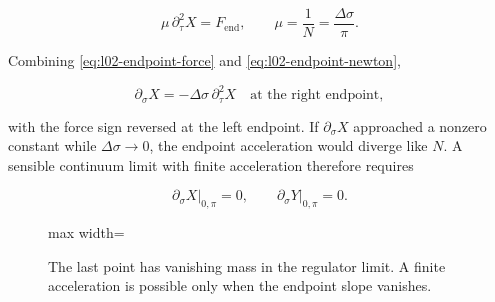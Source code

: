 \begin{equation}
  \mu\,\partial_\tau^2X=F_{\mathrm{end}},
  \qquad
  \mu=\frac1N=\frac{\Delta\sigma}{\pi}.
  \label{eq:l02-endpoint-newton}
\end{equation}

Combining \eqref{eq:l02-endpoint-force} and
\eqref{eq:l02-endpoint-newton},

\begin{equation}
  \partial_\sigma X
  =
  -\Delta\sigma\,\partial_\tau^2X
  \quad\text{at the right endpoint},
  \label{eq:l02-endpoint-scaling}
\end{equation}

with the force sign reversed at the left endpoint. If
\(\partial_\sigma X\) approached a nonzero constant while
\(\Delta\sigma\to0\), the endpoint acceleration would diverge like \(N\).
A sensible continuum limit with finite acceleration therefore requires

\begin{equation}
  \left.\partial_\sigma X\right|_{0,\pi}=0,
  \qquad
  \left.\partial_\sigma Y\right|_{0,\pi}=0.
  \label{eq:l02-open-neumann}
\end{equation}

\begin{figure}[H]
  \centering
  \begin{adjustbox}{max width=\linewidth}
  \end{adjustbox}
  \caption{The last point has vanishing mass in the regulator limit. A finite
  acceleration is possible only when the endpoint slope vanishes.}
  \label{fig:l02-neumann-redraw}
\end{figure}

